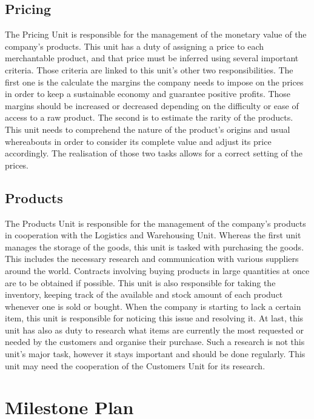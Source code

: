 \documentclass{article}
\begin{document}
\subsection{Pricing}

The Pricing Unit is responsible for the management of the monetary value of the company's products. This unit has a duty of assigning a price to each merchantable product, and that price must be inferred using several important criteria. Those criteria are linked to this unit's other two responsibilities. The first one is the calculate the margins the company needs to impose on the prices in order to keep a sustainable economy and guarantee positive profits. Those margins should be increased or decreased depending on the difficulty or ease of access to a raw product. The second is to estimate the rarity of the products. This unit needs to comprehend the nature of the product's origins and usual whereabouts in order to consider its complete value and adjust its price accordingly. The realisation of those two tasks allows for a correct setting of the prices.

\subsection{Products}

The Products Unit is responsible for the management of the company's products in cooperation with the Logistics and Warehousing Unit. Whereas the first unit manages the storage of the goods, this unit is tasked with purchasing the goods. This includes the necessary research and communication with various suppliers around the world. Contracts involving buying products in large quantities at once are to be obtained if possible. This unit is also responsible for taking the inventory, keeping track of the available and stock amount of each product whenever one is sold or bought. When the company is starting to lack a certain item, this unit is responsible for noticing this issue and resolving it. At last, this unit has also as duty to research what items are currently the most requested or needed by the customers and organise their purchase. Such a research is not this unit's major task, however it stays important and should be done regularly. This unit may need the cooperation of the Customers Unit for its research.

\section{Milestone Plan}
\end{document}
